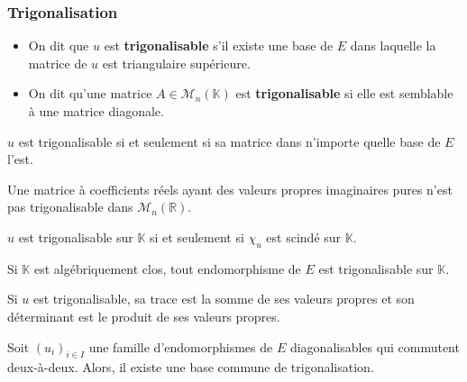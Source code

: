   \subsubsection{Trigonalisation}


  \begin{definition}
    \begin{itemize}
      \item On dit que $u$ est \textbf{trigonalisable} s'il existe une base de $E$ dans laquelle la matrice de $u$ est triangulaire supérieure.
      \item On dit qu'une matrice $A \in \mathcal{M}_n(\mathbb{K})$ est \textbf{trigonalisable} si elle est semblable à une matrice diagonale.
    \end{itemize}
  \end{definition}

  \begin{remark}
    $u$ est trigonalisable si et seulement si sa matrice dans n'importe quelle base de $E$ l'est.
  \end{remark}

  \begin{example}
    Une matrice à coefficients réels ayant des valeurs propres imaginaires pures n'est pas trigonalisable dans $\mathcal{M}_n(\mathbb{R})$.
  \end{example}

  \begin{theorem}
    $u$ est trigonalisable sur $\mathbb{K}$ si et seulement si $\chi_u$ est scindé sur $\mathbb{K}$.
  \end{theorem}

  \begin{corollary}
    Si $\mathbb{K}$ est algébriquement clos, tout endomorphisme de $E$ est trigonalisable sur $\mathbb{K}$.
  \end{corollary}

  \begin{proposition}
    Si $u$ est trigonalisable, sa trace est la somme de ses valeurs propres et son déterminant est le produit de ses valeurs propres.
  \end{proposition}

  \begin{theorem}
    Soit $(u_i)_{i \in I}$ une famille d'endomorphismes de $E$ diagonalisables qui commutent deux-à-deux. Alors, il existe une base commune de trigonalisation.
  \end{theorem}

